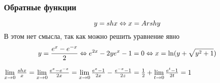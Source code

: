 \subsubsection*{Обратные функции}

$$
	y = sh x \Leftrightarrow x = Arsh y
$$
В этом нет смысла, так как можно решить уравнение явно
$$
	y = \frac{e^x - e^{-x}}{2} \Leftrightarrow e^{2x} - 2ye^x - 1 = 0 \Leftrightarrow x = \ln (y + \sqrt{y^2 + 1})
$$

\begin{addition}
	$\lim\limits_{x \to 0} \frac{sh x}{x} = \lim\limits_{x \to 0} \frac{e^x - e^{-x}}{2x} = \lim\limits_{x \to 0} \frac{e^x - 1}{2x} - \frac{e^{-x} - 1}{2z} = \frac{1}{2} + \lim\limits_{t \to 0} \frac{e^t - 1}{2t} = 1$
\end{addition}